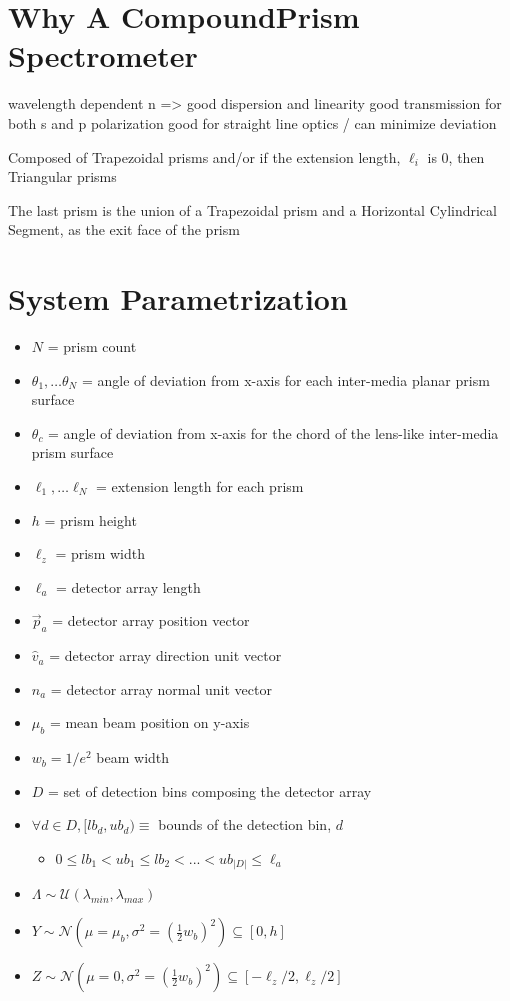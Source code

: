 \documentclass{article}
\begin{document}
\section{Why A CompoundPrism Spectrometer}\label{sec:why-a-compoundprism-spectrometer}
wavelength dependent n => good dispersion and linearity
good transmission for both s and p polarization
good for straight line optics / can minimize deviation

Composed of Trapezoidal prisms and/or if the extension length, ${\ell_i }$ is 0, then Triangular prisms

The last prism is the union of a Trapezoidal prism and a Horizontal Cylindrical Segment, as the exit
face of the prism

\section{System Parametrization}\label{sec:system-parametrization}
\begin{itemize}
\item $N$ = prism count
\item ${\theta_1, \dots \theta_N }$ =  angle of deviation from x-axis for each inter-media planar prism surface
\item $\theta_c$ =  angle of deviation from x-axis for the chord of the lens-like inter-media prism surface
\item ${\ell_1, \dots \ell_N }$ = extension length for each prism
\item $h$ = prism height
\item $\ell_z$  = prism width
\item $\ell_a$  = detector array length
\item $\vec{p}_a$ = detector array position vector
\item $\hat{v}_a$ = detector array direction unit vector
\item $\hat{n}_a$ = detector array normal unit vector
\item $\mu_b$ = mean beam position on y-axis
\item $w_b = 1 / e^2$ {beam width}
\item $D$ = set of detection bins composing the detector array
\item $\forall d \in D, [lb_d, ub_d) \equiv$ bounds of the detection bin, $d$
\begin{itemize}
\item[\textasteriskcentered] $0 \leq lb_1 < ub_1 \leq lb_2 < ... < ub_{|D|} \leq \ell_a $
\end{itemize}
\item $\Lambda \sim \mathcal{U}(\lambda_{min}, \lambda_{max}) $
\item $Y \sim \mathcal {N}(\mu=\mu_b, \sigma^2=(\frac{1}{2}w_b)^2) \subseteq [0, h] $
\item $Z \sim \mathcal {N}(\mu=0, \sigma^2=(\frac{1}{2}w_b)^2) \subseteq [-\ell_z / 2, \ell_z / 2]$
\end{itemize}
\end{document}
